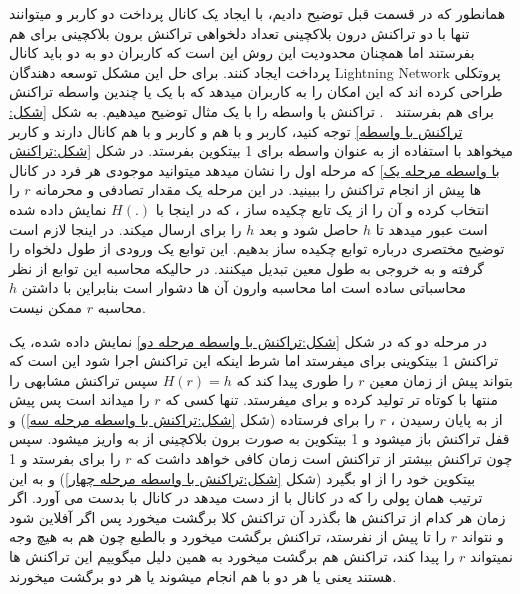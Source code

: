  همانطور که در قسمت قبل توضیح دادیم، با ایجاد یک کانال پرداخت دو کاربر  و  میتوانند تنها با دو تراکنش درون بلاکچینی تعداد دلخواهی تراکنش برون بلاکچینی برای هم بفرستند اما همچنان محدودیت این روش این است که کاربران دو به دو باید کانال پرداخت ایجاد کنند. برای حل این مشکل توسعه دهندگان Lightning Network پروتکلی طراحی کرده اند که این امکان را به کاربران میدهد که با یک یا چندین واسطه تراکنش برای هم بفرستند
~\cite{poon2015lightning}.
تراکنش با واسطه را با یک مثال توضیح میدهیم. به شکل \ref{شکل: تراکنش با واسطه} توجه کنید، کاربر  و  با هم و کاربر  و  با هم کانال دارند و کاربر  میخواهد با استفاده از   به عنوان واسطه برای  1 بیتکوین بفرستد. در شکل \ref{شکل:تراکنش با واسطه مرحله یک} 
که مرحله اول را نشان میدهد میتوانید موجودی هر فرد در کانال ها پیش از انجام تراکنش را ببینید. در این مرحله  یک مقدار تصادفی و محرمانه
$r$
را انتخاب کرده و آن را از یک تابع چکیده ساز ، که در اینجا با 
$H(.)$
نمایش داده شده است عبور میدهد تا 
$h$
حاصل شود و بعد
$h$ 
را برای  ارسال میکند. در اینجا لازم است توضیح مختصری درباره توابع چکیده ساز بدهیم. این توابع یک ورودی از طول دلخواه را گرفته و به خروجی به طول معین تبدیل میکنند. در حالیکه محاسبه این توابع از نظر محاسباتی ساده است اما محاسبه وارون آن ها دشوار است بنابراین با داشتن 
$h$
محاسبه 
$r$
ممکن نیست.

در مرحله دو که در شکل \ref{شکل:تراکنش با واسطه مرحله دو} نمایش داده شده،    یک تراکنش 1 بیتکوینی برای   میفرستد اما شرط اینکه این تراکنش اجرا شود این است که   بتواند پیش از زمان معین 
$r$
را طوری پیدا کند که 
$H(r)=h$
سپس  تراکنش مشابهی را منتها با   کوتاه تر تولید کرده و برای  میفرستد. تنها کسی که
$r$
را میداند  است پس پیش از به پایان رسیدن  ، 
$r$
را برای  فرستاده (شکل \ref{شکل:تراکنش با واسطه مرحله سه}) و قفل تراکنش باز میشود و 1 بیتکوین به صورت برون بلاکچینی از  به  واریز میشود. سپس چون  تراکنش   بیشتر از   تراکنش   است  زمان کافی خواهد داشت که 
$r$
را برای  بفرستد و 1 بیتکوین خود را از او بگیرد (شکل \ref{شکل:تراکنش با واسطه مرحله چهار}) و به این ترتیب  همان پولی را که در کانال با  از دست میدهد در کانال با   بدست می آورد.  اگر زمان   هر کدام از تراکنش ها بگذرد آن تراکنش کلا برگشت میخورد پس اگر   آفلاین شود و نتواند
$r$
را تا پیش از  نفرستد، تراکنش  برگشت میخورد و بالطبع چون   هم به هیچ وجه نمیتواند 
$r$
را پیدا کند، تراکنش   هم برگشت میخورد به همین دلیل میگوییم این تراکنش ها  هستند یعنی یا هر دو با هم انجام میشوند یا هر دو برگشت میخورند.

